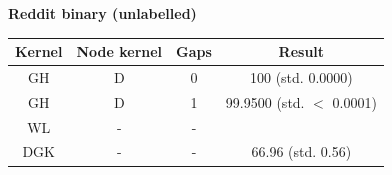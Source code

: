 \documentclass{article}
\begin{document}
\textbf{Reddit binary (unlabelled)}\\
\begin{minipage}{0.6\linewidth}
	\hspace*{-1in}

	\label{fig:reddit_binary_unlabelled}
\end{minipage}
\begin{minipage}[c]{0.5\linewidth}
	
	\centering
	\begin{tabular}{c|c|c|c}
		Kernel & Node kernel & Gaps & Result\\
		\hline
		GH & D & 0 & 100 (std. 0.0000)\\
		GH & D & 1 & 99.9500 (std. $<$ 0.0001)\\
		WL & - & - & \\
		DGK & - & - & 66.96 (std. 0.56)
	\end{tabular}
	\label{table:reddit_binary_unlabelled}
\end{minipage}
\end{document}
